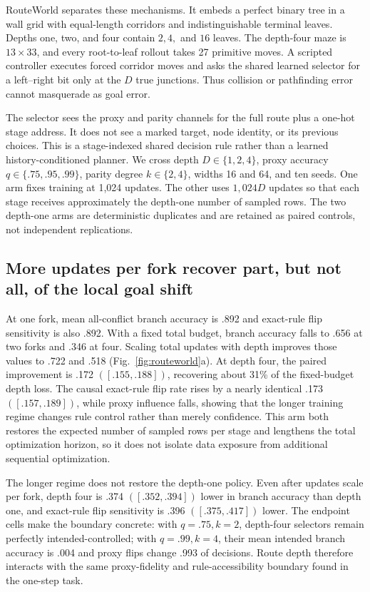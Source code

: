 \documentclass[11pt,a4paper]{article}
\newcommand{\fig}[1]{Fig.~\ref{#1}}
\begin{document}
RouteWorld separates these mechanisms. It embeds a perfect binary tree in a wall grid with equal-length corridors and indistinguishable terminal leaves. Depths one, two, and four contain $2,4,$ and $16$ leaves. The depth-four maze is $13\times33$, and every root-to-leaf rollout takes 27 primitive moves. A scripted controller executes forced corridor moves and asks the shared learned selector for a left--right bit only at the $D$ true junctions. Thus collision or pathfinding error cannot masquerade as goal error.

The selector sees the proxy and parity channels for the full route plus a one-hot stage address. It does not see a marked target, node identity, or its previous choices. This is a stage-indexed shared decision rule rather than a learned history-conditioned planner. We cross depth $D\in\{1,2,4\}$, proxy accuracy $q\in\{.75,.95,.99\}$, parity degree $k\in\{2,4\}$, widths 16 and 64, and ten seeds. One arm fixes training at 1,024 updates. The other uses $1{,}024D$ updates so that each stage receives approximately the depth-one number of sampled rows. The two depth-one arms are deterministic duplicates and are retained as paired controls, not independent replications.

\subsection*{More updates per fork recover part, but not all, of the local goal shift}

At one fork, mean all-conflict branch accuracy is .892 and exact-rule flip sensitivity is also .892. With a fixed total budget, branch accuracy falls to .656 at two forks and .346 at four. Scaling total updates with depth improves those values to .722 and .518 (\fig{fig:routeworld}a). At depth four, the paired improvement is .172 $([.155,.188])$, recovering about 31\% of the fixed-budget depth loss. The causal exact-rule flip rate rises by a nearly identical .173 $([.157,.189])$, while proxy influence falls, showing that the longer training regime changes rule control rather than merely confidence. This arm both restores the expected number of sampled rows per stage and lengthens the total optimization horizon, so it does not isolate data exposure from additional sequential optimization.

The longer regime does not restore the depth-one policy. Even after updates scale per fork, depth four is .374 $([.352,.394])$ lower in branch accuracy than depth one, and exact-rule flip sensitivity is .396 $([.375,.417])$ lower. The endpoint cells make the boundary concrete: with $q=.75,k=2$, depth-four selectors remain perfectly intended-controlled; with $q=.99,k=4$, their mean intended branch accuracy is .004 and proxy flips change .993 of decisions. Route depth therefore interacts with the same proxy-fidelity and rule-accessibility boundary found in the one-step task.
\end{document}

